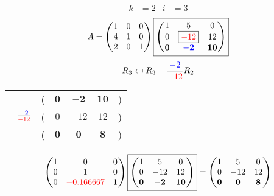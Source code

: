 \documentclass[pdf]{beamer}
\begin{document}
\begin{frame}{}\begin{align*} k &= 2 & i &= 3 \end{align*} $$A=\begin{pmatrix}1&0&0\\4&1&0\\2&0&1\end{pmatrix} \boxed{\begin{pmatrix}1&5&0\\0&\boxed{{\color{red}-12}}&12\\\mathbf{0}&\mathbf{{\color{blue}-2}}&\mathbf{10}\end{pmatrix}} $$ $$R_3 \mapsfrom R_3 - \frac{{\color{blue}-2}}{{\color{red}-12}} R_2$$ \begin{center}\begin{tabular}{cccccc}  &(& $ \mathbf{0} $ & $ \mathbf{-2} $ & $ \mathbf{10} $ &)\\$ -\frac{{\color{blue}-2}}{{\color{red}-12}} $&(& $ 0 $ & $ -12 $ & $ 12 $ &)\\\hline  &(& $ \mathbf{0} $ & $ \mathbf{0} $ & $ \mathbf{8} $ &) \end{tabular}\end{center} $$ \begin{pmatrix}1&0&0\\0&1&0\\0&{\color{red}-0.166667}&1\end{pmatrix} \boxed{\begin{pmatrix}1&5&0\\0&-12&12\\\mathbf{0}&\mathbf{-2}&\mathbf{10}\end{pmatrix}} = \begin{pmatrix}1&5&0\\0&-12&12\\\mathbf{0}&\mathbf{0}&\mathbf{8}\end{pmatrix} $$\end{frame}
\end{document}
